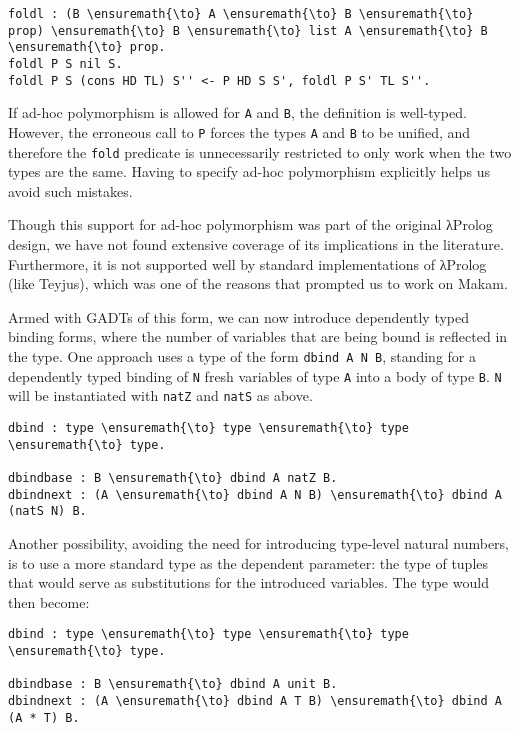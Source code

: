 \begin{verbatim}
foldl : (B \ensuremath{\to} A \ensuremath{\to} B \ensuremath{\to} prop) \ensuremath{\to} B \ensuremath{\to} list A \ensuremath{\to} B \ensuremath{\to} prop.
foldl P S nil S.
foldl P S (cons HD TL) S'' <- P HD S S', foldl P S' TL S''.
\end{verbatim}

If ad-hoc polymorphism is allowed for \texttt{A} and \texttt{B}, the
definition is well-typed. However, the erroneous call to \texttt{P}
forces the types \texttt{A} and \texttt{B} to be unified, and therefore
the \texttt{fold} predicate is unnecessarily restricted to only work
when the two types are the same. Having to specify ad-hoc polymorphism
explicitly helps us avoid such mistakes.

Though this support for ad-hoc polymorphism was part of the original
\foreignlanguage{greek}{λ}Prolog design, we have not found extensive coverage of its implications
in the literature. Furthermore, it is not supported well by standard
implementations of \foreignlanguage{greek}{λ}Prolog (like Teyjus), which was one of the reasons
that prompted us to work on Makam.

Armed with GADTs of this form, we can now introduce dependently typed
binding forms, where the number of variables that are being bound is
reflected in the type. One approach uses a type of the form
\texttt{dbind\ A\ N\ B}, standing for a dependently typed binding of
\texttt{N} fresh variables of type \texttt{A} into a body of type
\texttt{B}. \texttt{N} will be instantiated with \texttt{natZ} and
\texttt{natS} as above.

\begin{verbatim}
dbind : type \ensuremath{\to} type \ensuremath{\to} type \ensuremath{\to} type. 

dbindbase : B \ensuremath{\to} dbind A natZ B.
dbindnext : (A \ensuremath{\to} dbind A N B) \ensuremath{\to} dbind A (natS N) B.
\end{verbatim}

Another possibility, avoiding the need for introducing type-level
natural numbers, is to use a more standard type as the dependent
parameter: the type of tuples that would serve as substitutions for the
introduced variables. The type would then become:

\begin{verbatim}
dbind : type \ensuremath{\to} type \ensuremath{\to} type \ensuremath{\to} type.

dbindbase : B \ensuremath{\to} dbind A unit B.
dbindnext : (A \ensuremath{\to} dbind A T B) \ensuremath{\to} dbind A (A * T) B.
\end{verbatim}

